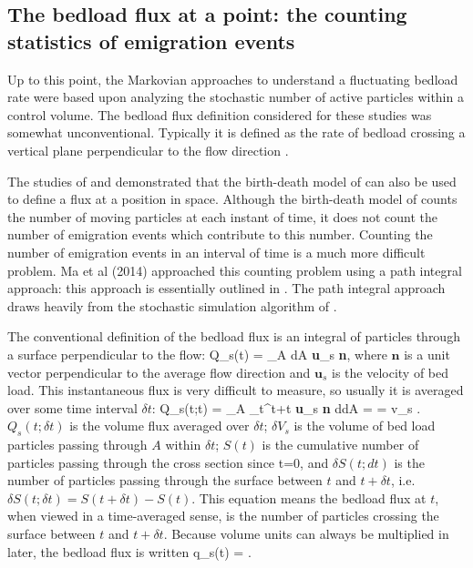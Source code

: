 
\subsection{The bedload flux at a point: the counting statistics of emigration events} 

Up to this point, the Markovian approaches to understand a fluctuating bedload rate were based upon analyzing the stochastic number of active particles within a control volume. 
The bedload flux definition considered for these studies was somewhat unconventional. 
Typically it is defined as the rate of bedload crossing a vertical plane perpendicular to the flow direction \citep{Ballio2014}. 

The studies of \citet{Heyman2013} and \citet{Ma2014b} demonstrated that the birth-death model of \citet{Ancey2008} can also be used to define a flux at a position in space. 
Although the birth-death model of \citet{Ancey2008} counts the number of moving particles at each instant of time, it does not count the number of emigration events which contribute to this number. 
Counting the number of emigration events in an interval of time is a much more difficult problem.
Ma et al (2014) approached this counting problem using a path integral approach: this approach is essentially outlined in \citet{Ohkubo2009}. 
The path integral approach draws heavily from the stochastic simulation algorithm of \citet{Gillespie1977}. 

The conventional definition of the bedload flux is an integral of particles through a surface perpendicular to the flow: 
\be Q_s(t) = \int \int_A dA \textbf{u}_s \cdot \textbf{n}, \ee
where $\textbf{n}$ is a unit vector perpendicular to the average flow direction and $\textbf{u}_s$ is the velocity of bed load. 
This instantaneous flux is very difficult to measure, so usually it is averaged over some time interval $\delta t$: 
\be Q_s(t;\delta t) =  \int \int_A \int_t^{t+\delta t} \textbf{u}_s \cdot \textbf{n} d\tau dA =  = v_s . \ee
$Q_s(t;\delta t)$ is the volume flux averaged over $\delta t$; $\delta V_s$ is the volume of bed load particles passing through $A$ within $\delta t$; $S(t)$ is the cumulative number of particles passing through the cross section since t=0, and $\delta S(t;dt)$ is the number of particles passing through the surface between $t$ and $t+\delta t$, i.e. $\delta S(t; \delta t) = S(t+\delta t) - S(t)$. 
This equation means the bedload flux at $t$, when viewed in a time-averaged sense, is the number of particles crossing the surface between $t$ and $t+\delta t$. 
Because volume units can always be multiplied in later, the bedload flux is written 
\be q_s(t) = . \ee

